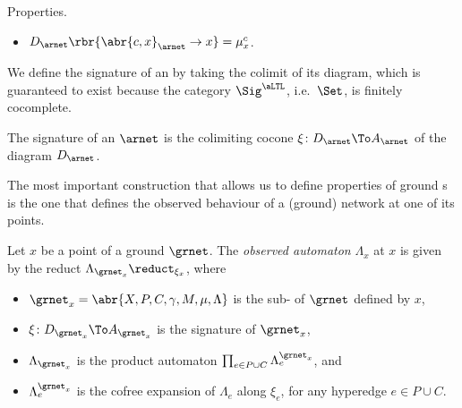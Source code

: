 \documentclass{LMCS}
\begin{document}
\begin{minisection}{Properties.}
\begin{fact}
\begin{itemize}
\begin{itemize}
        \item \(D_{\arnet}\rbr{\abr{c, x}_{\arnet} \to x} = \mu^{c}_{x}\).
          
        \end{itemize}
        
      \end{itemize}
    \end{fact}

\noindent     We define the signature of an  by taking the colimit of its diagram, which is guaranteed to exist because the category \(\Sig^{\aLTL}\), i.e.\ \(\Set\), is finitely cocomplete.

    \begin{defi}
      The signature of an  \(\arnet\) is the colimiting cocone \(\xi \colon D_{\arnet} \To A_{\arnet}\) of the diagram \(D_{\arnet}\).
    \end{defi}

    The most important construction that allows us to define properties of ground s is the one that defines the observed behaviour of a (ground) network at one of its points.

    \begin{defi}
      \label{definition:observed-automaton}
      Let \(x\) be a point of a ground  \(\grnet\).
      The \emph{observed automaton} \(\Lambda_{x}\) at \(x\) is given by the reduct \(\Lambda_{\grnet_{x}} \reduct_{\xi_{x}}\), where
      \begin{itemize}
        
      \item \(\grnet_{x} = \abr{X, P, C, \gamma, M, \mu, \Lambda}\) is the sub- of \(\grnet\) defined by \(x\),
        
      \item \(\xi \colon D_{\grnet_{x}} \To A_{\grnet_{x}}\) is the signature of \(\grnet_{x}\),
        
      \item \(\Lambda_{\grnet_{x}}\) is the product automaton \(\prod_{e \in P \cup C} \Lambda^{\grnet_{x}}_{e}\), and
        
      \item \(\Lambda^{\grnet_{x}}_{e}\) is the cofree expansion of \(\Lambda_{e}\) along \(\xi_{e}\), for any hyperedge \(e \in P \cup C\).
        
      \end{itemize}
    \end{defi}


\end{minisection}
\end{document}

